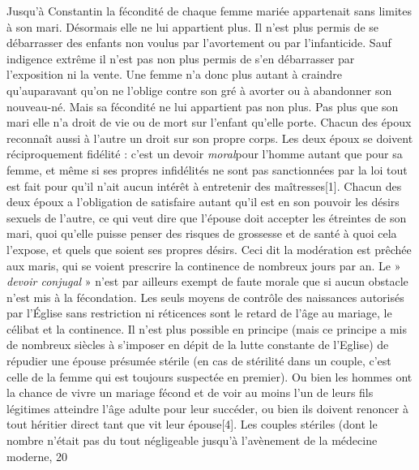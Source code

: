  Jusqu'à Constantin la fécondité de chaque femme mariée appartenait sans limites à son mari. Désormais elle ne lui appartient plus. Il n'est plus permis de se débarrasser des enfants non voulus par l'avortement ou par l'infanticide. Sauf indigence extrême il n'est pas non plus permis de s'en débarrasser par l'exposition ni la vente. Une femme n'a donc plus autant à craindre qu'auparavant qu'on ne l'oblige contre son gré à avorter ou à abandonner son nouveau-né. Mais sa fécondité ne lui appartient pas non plus. Pas plus que son mari elle n'a droit de vie ou de mort sur l'enfant qu'elle porte. Chacun des époux reconnaît aussi à l'autre un droit sur son propre corps. Les deux époux se doivent réciproquement fidélité : c'est un devoir \emph{moral}pour l'homme autant que pour sa femme, et même si ses propres infidélités ne sont pas sanctionnées par la loi tout est fait pour qu'il n'ait aucun intérêt à entretenir des maîtresses[1]. Chacun des deux époux a l'obligation de satisfaire autant qu'il est en son pouvoir les désirs sexuels de l'autre, ce qui veut dire que l'épouse doit accepter les étreintes de son mari, quoi qu'elle puisse penser des risques de grossesse et de santé à quoi cela l'expose, et quels que soient ses propres désirs. Ceci dit la modération est prêchée aux maris, qui se voient prescrire la continence de nombreux jours par an. Le » \emph{devoir conjugal} » n'est par ailleurs exempt de faute morale que si aucun obstacle n'est mis à la fécondation. Les seuls moyens de contrôle des naissances autorisés par l'Église sans restriction ni réticences sont le retard de l'âge au mariage, le célibat et la continence. 
 Il n'est plus possible en principe (mais ce principe a mis de nombreux siècles à s'imposer en dépit de la lutte constante de l'Eglise) de répudier une épouse présumée stérile (en cas de stérilité dans un couple, c'est celle de la femme qui est toujours suspectée en premier). Ou bien les hommes ont la chance de vivre un mariage fécond et de voir au moins l'un de leurs fils légitimes atteindre l'âge adulte pour leur succéder, ou bien ils doivent renoncer à tout héritier direct tant que vit leur épouse[4]. Les couples stériles (dont le nombre n'était pas du tout négligeable jusqu'à l'avènement de la médecine moderne, 20 %
